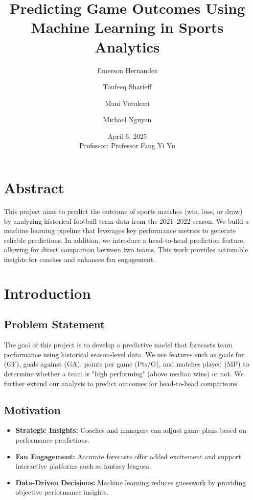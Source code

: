 \documentclass[a4paper,12pt]{article}
\title{Predicting Game Outcomes Using Machine Learning in Sports Analytics}
\author{Emerson Hernandez \and Toufeeq Sharieff \and Mani Vutukuri \and Michael Nguyen}
\date{April 6, 2025\\Professor: Professor Fang Yi Yu}
\begin{document}
\maketitle
\tableofcontents
\newpage

\section*{Abstract}
This project aims to predict the outcome of sports matches (win, loss, or draw) by analyzing historical football team data from the 2021--2022 season. We build a machine learning pipeline that leverages key performance metrics to generate reliable predictions. In addition, we introduce a head-to-head prediction feature, allowing for direct comparison between two teams. This work provides actionable insights for coaches and enhances fan engagement.

\section{Introduction}
\subsection{Problem Statement}
The goal of this project is to develop a predictive model that forecasts team performance using historical season-level data. We use features such as goals for (GF), goals against (GA), points per game (Pts/G), and matches played (MP) to determine whether a team is "high performing" (above median wins) or not. We further extend our analysis to predict outcomes for head-to-head comparisons.

\subsection{Motivation}
\begin{itemize}
    \item \textbf{Strategic Insights:} Coaches and managers can adjust game plans based on performance predictions.
    \item \textbf{Fan Engagement:} Accurate forecasts offer added excitement and support interactive platforms such as fantasy leagues.
    \item \textbf{Data-Driven Decisions:} Machine learning reduces guesswork by providing objective performance insights.
\end{itemize}
\end{document}
